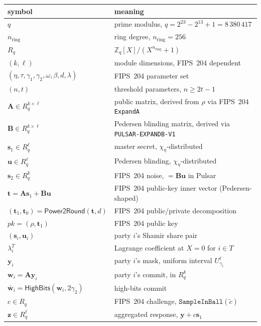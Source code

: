 \documentclass[11pt,a4paper]{article}
\theoremstyle{definition}
\theoremstyle{remark}
\newcommand{\Rq}{R_q}
\newcommand{\Zq}{\mathbb{Z}_q}
\newcommand{\HighBits}{\mathsf{HighBits}}
\newcommand{\Power}{\mathsf{Power2Round}}
\begin{document}
\begin{center}
\begin{tabular}{l l}
\toprule
symbol & meaning \\
\midrule
$q$ & prime modulus, $q = 2^{23} - 2^{13} + 1 = 8\,380\,417$ \\
$n_{\mathrm{ring}}$ & ring degree, $n_{\mathrm{ring}} = 256$ \\
$\Rq$ & $\Zq[X]/(X^{n_{\mathrm{ring}}} + 1)$ \\
$(k, \ell)$ & module dimensions, FIPS~204 dependent \\
$(\eta, \tau, \gamma_1, \gamma_2, \omega, \beta, d, \lambda)$ & FIPS~204 parameter set \\
$(n, t)$ & threshold parameters, $n \ge 2t-1$ \\
$\mathbf{A} \in \Rq^{k \times \ell}$ & public matrix, derived from $\rho$ via FIPS~204 \texttt{ExpandA} \\
$\mathbf{B} \in \Rq^{k \times \ell}$ & Pedersen blinding matrix, derived via \texttt{PULSAR-EXPANDB-V1} \\
$\mathbf{s}_1 \in \Rq^\ell$ & master secret, $\chi_\eta$-distributed \\
$\mathbf{u} \in \Rq^\ell$ & Pedersen blinding, $\chi_\eta$-distributed \\
$\mathbf{s}_2 \in \Rq^k$ & FIPS~204 noise, $= \mathbf{B}\mathbf{u}$ in Pulsar \\
$\mathbf{t} = \mathbf{A}\mathbf{s}_1 + \mathbf{B}\mathbf{u}$ & FIPS~204 public-key inner vector (Pedersen-shaped) \\
$(\mathbf{t}_1, \mathbf{t}_0) = \Power(\mathbf{t}, d)$ & FIPS~204 public/private decomposition \\
$\mathit{pk} = (\rho, \mathbf{t}_1)$ & FIPS~204 public key \\
$(\mathbf{s}_i, \mathbf{u}_i)$ & party $i$'s Shamir share pair \\
$\lambda_i^T$ & Lagrange coefficient at $X = 0$ for $i \in T$ \\
$\mathbf{y}_i$ & party $i$'s mask, uniform interval $U_{\gamma_1}^\ell$ \\
$\mathbf{w}_i = \mathbf{A}\mathbf{y}_i$ & party $i$'s commit, in $\Rq^k$ \\
$\bar{\mathbf{w}}_i = \HighBits(\mathbf{w}_i, 2\gamma_2)$ & high-bits commit \\
$c \in \Rq$ & FIPS~204 challenge, $\texttt{SampleInBall}(\tilde c)$ \\
$\mathbf{z} \in \Rq^\ell$ & aggregated response, $\mathbf{y} + c\mathbf{s}_1$ \\

\end{tabular}
\end{center}
\end{document}
